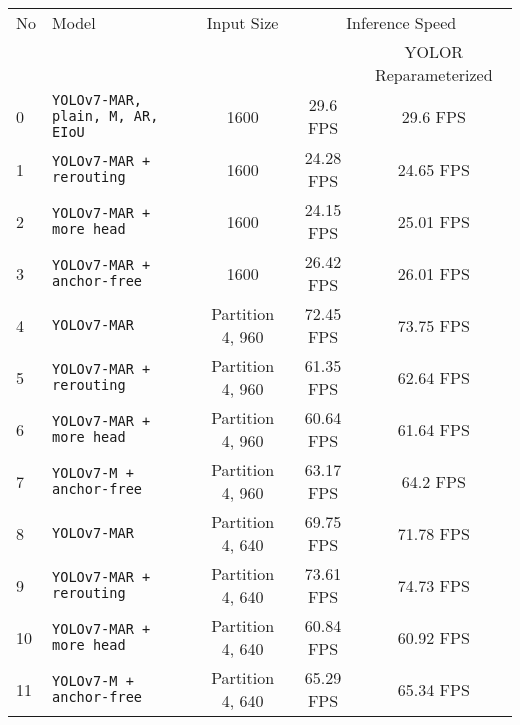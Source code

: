 \begin{tabular}{ l l c c c}
  \toprule[1.5pt]
  No & Model                                       &   Input Size         &\multicolumn{2}{c}{Inference Speed}          \\
     &                                             &                      &                     & \footnotesize{YOLOR Reparameterized} \\
  \midrule
  0  & \texttt{YOLOv7-MAR, plain, M, AR, EIoU}     &      1600            & 29.6 FPS            & 29.6 FPS   \\
  1  & \texttt{YOLOv7-MAR + rerouting}             &      1600            & 24.28 FPS           & 24.65 FPS   \\
  2  & \texttt{YOLOv7-MAR + more head}             &      1600            & 24.15 FPS           & 25.01 FPS   \\
  3  & \texttt{YOLOv7-MAR + anchor-free}           &      1600            & 26.42 FPS           & 26.01 FPS   \\
  \midrule
  4  & \texttt{YOLOv7-MAR}                         &  Partition 4, 960    & 72.45 FPS           & 73.75 FPS  \\
  5  & \texttt{YOLOv7-MAR + rerouting}             &  Partition 4, 960    & 61.35 FPS           & 62.64 FPS  \\
  6  & \texttt{YOLOv7-MAR + more head}             &  Partition 4, 960    & 60.64 FPS           & 61.64 FPS  \\
  7  & \texttt{YOLOv7-M + anchor-free}             &  Partition 4, 960    & 63.17 FPS           & 64.2 FPS   \\
  \midrule
  8  & \texttt{YOLOv7-MAR}                         &  Partition 4, 640    & 69.75 FPS           & 71.78 FPS  \\
  9  & \texttt{YOLOv7-MAR + rerouting}             &  Partition 4, 640    & 73.61 FPS           & 74.73 FPS  \\
  10 & \texttt{YOLOv7-MAR + more head}             &  Partition 4, 640    & 60.84 FPS           & 60.92 FPS  \\
  11 & \texttt{YOLOv7-M + anchor-free}             &  Partition 4, 640    & 65.29 FPS           & 65.34 FPS \\
  \bottomrule[1.5pt]
\end{tabular}